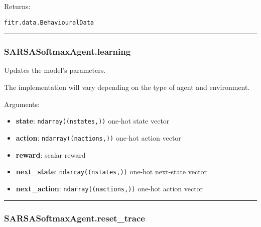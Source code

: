 Returns:

\texttt{fitr.data.BehaviouralData}

\begin{center}\rule{0.5\linewidth}{\linethickness}\end{center}

\hypertarget{sarsasoftmaxagent.learning}{%
\subsubsection{SARSASoftmaxAgent.learning}\label{sarsasoftmaxagent.learning}}

\begin{Shaded}
\begin{Highlighting}[]
\end{Highlighting}
\end{Shaded}

Updates the model's parameters.

The implementation will vary depending on the type of agent and
environment.

Arguments:

\begin{itemize}
\tightlist
\item
  \textbf{state}: \texttt{ndarray((nstates,))} one-hot state vector
\item
  \textbf{action}: \texttt{ndarray((nactions,))} one-hot action vector
\item
  \textbf{reward}: scalar reward
\item
  \textbf{next\_state}: \texttt{ndarray((nstates,))} one-hot next-state
  vector
\item
  \textbf{next\_action}: \texttt{ndarray((nactions,))} one-hot action
  vector
\end{itemize}

\begin{center}\rule{0.5\linewidth}{\linethickness}\end{center}

\hypertarget{sarsasoftmaxagent.reset_trace}{%
\subsubsection{SARSASoftmaxAgent.reset\_trace}\label{sarsasoftmaxagent.reset_trace}}

\begin{Shaded}
\begin{Highlighting}[]
\OperatorTok{=}\NormalTok{)}
\end{Highlighting}
\end{Shaded}

